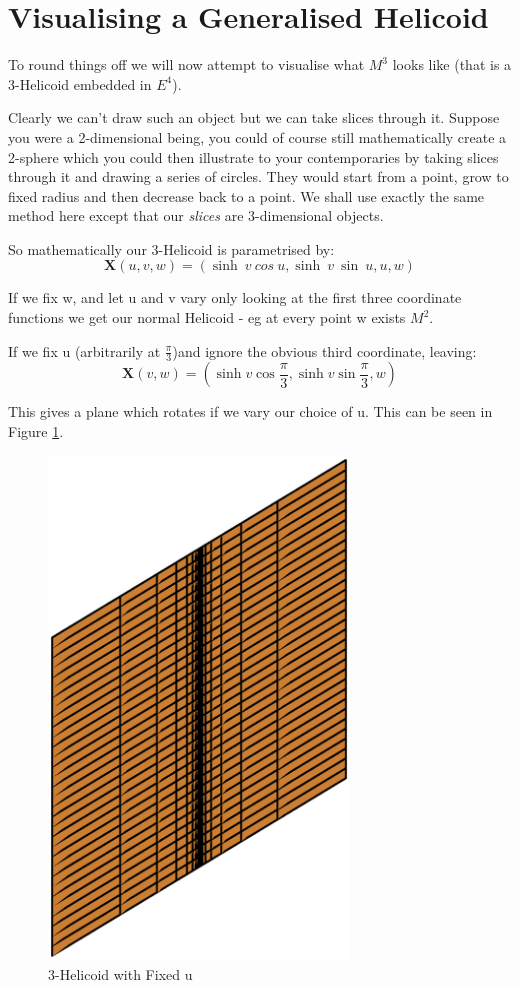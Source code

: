 \section{Visualising a Generalised Helicoid}
To round things off we will now attempt to visualise what $M^3$ looks like (that is a 3-Helicoid embedded in $E^4$).

Clearly we can't draw such an object but we can take slices through it. Suppose you were a 2-dimensional being, you could of course still mathematically create a 2-sphere which you could then illustrate to your contemporaries by taking slices through it and drawing a series of circles. They would start from a point, grow to fixed radius and then decrease back to a point. We shall use exactly the same method here except that our \emph{slices} are 3-dimensional objects.

So mathematically our 3-Helicoid is parametrised by:
\begin{displaymath}
\mathbf X(u,v,w) = (\sinh \: v\: cos \: u, \sinh \:v \: \sin \:u, u, w)
\end{displaymath}

If we fix w, and let u and v vary only looking at the first three coordinate functions we get our normal Helicoid - eg at every point w exists $M^2$.

If we fix u (arbitrarily at $\frac{\pi}{3}$)and ignore the obvious third coordinate, leaving:
\begin{displaymath}
\mathbf X(v,w) = (\sinh v \cos \frac{\pi}{3}, \sinh v \sin \frac{\pi}{3}, w)
\end{displaymath}

This gives a plane which rotates if we vary our choice of u. This can be seen in Figure \ref{fig:3HelFixedu}.
\begin{figure}[htbp]
	\centering
       \includegraphics[width=8cm]{Images/3HelFixedu.eps}
   \caption{3-Helicoid with Fixed u}
   \label{fig:3HelFixedu}
\end{figure}

